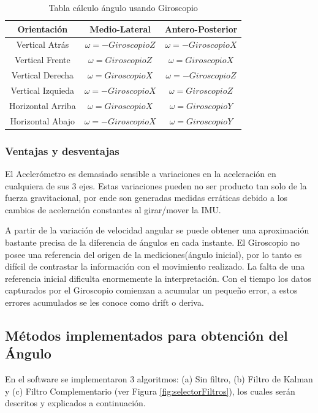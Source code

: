 \documentclass[12pt,a4paper]{article}
\begin{document}
\begin{table}[H]
	\centering
	\begin{tabular}{|c|c|c|}
		\hline 
		\textbf{Orientación} & \textbf{Medio-Lateral} & \textbf{Antero-Posterior} \\ 
		\hline 
		Vertical Atrás & $\omega= -GiroscopioZ$ &  $\omega= -GiroscopioX$ \\ 
		\hline 
		Vertical Frente & $\omega= GiroscopioZ$ &  $\omega= GiroscopioX$ \\
		\hline 
		Vertical Derecha & $\omega= GiroscopioX$ &  $\omega= -GiroscopioZ$ \\ 
		\hline 
		Vertical Izquieda & $\omega= -GiroscopioX$ &  $\omega= GiroscopioZ$ \\ 
		\hline 
		Horizontal Arriba & $\omega= GiroscopioX$ &  $\omega= GiroscopioY$ \\ 
		\hline 
		Horizontal Abajo & $\omega= -GiroscopioX$ &  $\omega= GiroscopioY$ \\ 
		\hline 
	\end{tabular}
	\caption{Tabla cálculo ángulo usando Giroscopio} 
	\label{table:calculoAnguloGiroscopio}
\end{table}



\subsubsection{Ventajas y desventajas}

El Acelerómetro es demasiado sensible a variaciones en la aceleración en cualquiera de sus 3 ejes. Estas variaciones pueden no ser producto tan solo de la fuerza gravitacional, por ende son generadas medidas erráticas debido a los cambios de aceleración constantes al girar/mover la IMU.

A partir de la variación de velocidad angular se puede obtener una aproximación bastante precisa de la diferencia de ángulos en cada instante.
El Giroscopio no posee una referencia del origen de la mediciones(ángulo inicial), por lo tanto es difícil de contrastar la información con el movimiento realizado.
La falta de una referencia inicial dificulta enormemente la interpretación. Con el tiempo los datos capturados por el Giroscopio comienzan a acumular un pequeño error, a estos errores acumulados se les conoce como drift o deriva.

\subsection{Métodos implementados para obtención del Ángulo}
En el software se implementaron 3 algoritmos: (a) Sin filtro, (b) Filtro de Kalman y (c) Filtro Complementario (ver Figura \ref{fig:selectorFiltros}), los cuales serán descritos y explicados a continuación.
	
\end{document}
